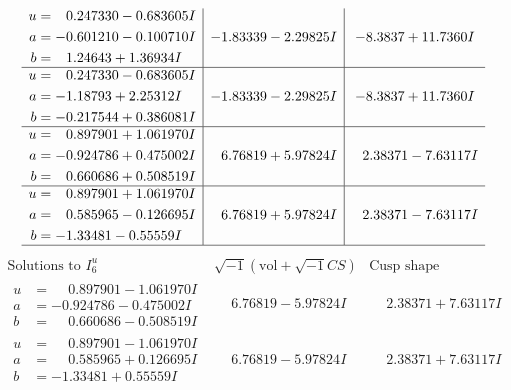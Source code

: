 \documentclass[1p]{elsarticle_modified}
\theoremstyle{definition}
\newcommand{\I}{\sqrt{-1}}
\begin{document}
$$\begin{array}{c|c|c}
\begin{aligned}
u &= \phantom{-}0.247330 - 0.683605 I \\
a &= -0.601210 - 0.100710 I \\
b &= \phantom{-}1.24643 + 1.36934 I\end{aligned}
 & -1.83339 - 2.29825 I & -8.3837 + 11.7360 I \\ \hline\begin{aligned}
u &= \phantom{-}0.247330 - 0.683605 I \\
a &= -1.18793 + 2.25312 I \\
b &= -0.217544 + 0.386081 I\end{aligned}
 & -1.83339 - 2.29825 I & -8.3837 + 11.7360 I \\ \hline\begin{aligned}
u &= \phantom{-}0.897901 + 1.061970 I \\
a &= -0.924786 + 0.475002 I \\
b &= \phantom{-}0.660686 + 0.508519 I\end{aligned}
 & \phantom{-}6.76819 + 5.97824 I & \phantom{-}2.38371 - 7.63117 I \\ \hline\begin{aligned}
u &= \phantom{-}0.897901 + 1.061970 I \\
a &= \phantom{-}0.585965 - 0.126695 I \\
b &= -1.33481 - 0.55559 I\end{aligned}
 & \phantom{-}6.76819 + 5.97824 I & \phantom{-}2.38371 - 7.63117 I\\
 \hline 
 \end{array}$$\newpage$$\begin{array}{c|c|c}  
\text{Solutions to }I^u_{6}& \I (\text{vol} + \sqrt{-1}CS) & \text{Cusp shape}\\
 \hline 
\begin{aligned}
u &= \phantom{-}0.897901 - 1.061970 I \\
a &= -0.924786 - 0.475002 I \\
b &= \phantom{-}0.660686 - 0.508519 I\end{aligned}
 & \phantom{-}6.76819 - 5.97824 I & \phantom{-}2.38371 + 7.63117 I \\ \hline\begin{aligned}
u &= \phantom{-}0.897901 - 1.061970 I \\
a &= \phantom{-}0.585965 + 0.126695 I \\
b &= -1.33481 + 0.55559 I\end{aligned}
 & \phantom{-}6.76819 - 5.97824 I & \phantom{-}2.38371 + 7.63117 I \\ \hline\begin{aligned}

\end{aligned}
\end{array}$$
\end{document}
